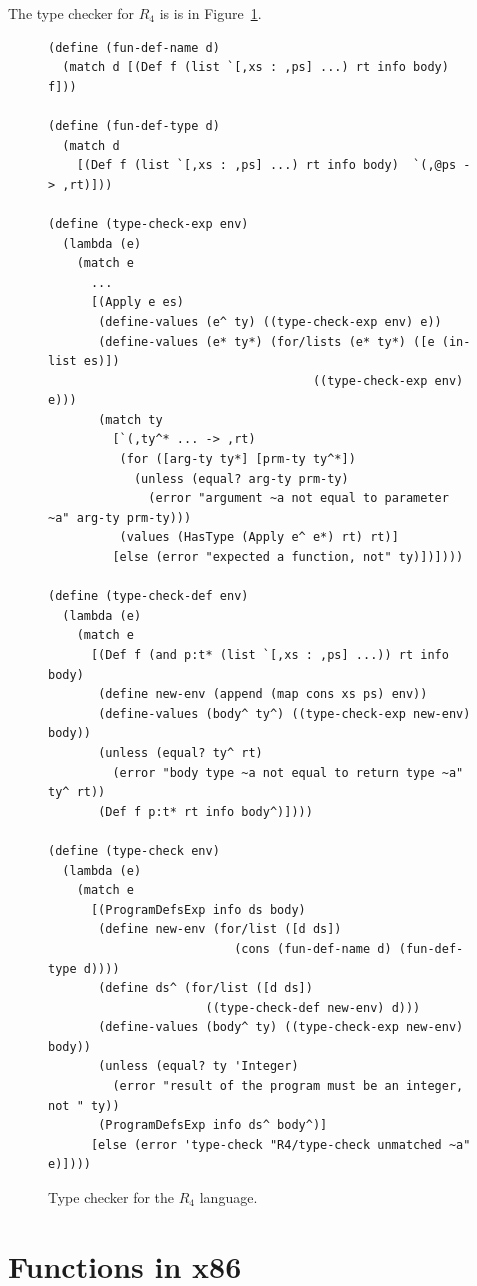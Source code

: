 \documentclass[11pt]{book}
\newcommand{\margincomment}[1]{\marginpar{\color{comment-red}\tiny #1}}
\newcommand{\margincomment}[1]{}
\begin{document}
\margincomment{TODO: explain type checker}

The type checker for $R_4$ is is in Figure~\ref{fig:type-check-R4}.

\begin{figure}[tp]
\begin{lstlisting}[basicstyle=\ttfamily\footnotesize]
(define (fun-def-name d)
  (match d [(Def f (list `[,xs : ,ps] ...) rt info body)  f]))

(define (fun-def-type d)
  (match d
    [(Def f (list `[,xs : ,ps] ...) rt info body)  `(,@ps -> ,rt)]))

(define (type-check-exp env)
  (lambda (e)
    (match e
      ...
      [(Apply e es)
       (define-values (e^ ty) ((type-check-exp env) e))
       (define-values (e* ty*) (for/lists (e* ty*) ([e (in-list es)])
                                     ((type-check-exp env) e)))
       (match ty
         [`(,ty^* ... -> ,rt)
          (for ([arg-ty ty*] [prm-ty ty^*])
            (unless (equal? arg-ty prm-ty)
              (error "argument ~a not equal to parameter ~a" arg-ty prm-ty)))
          (values (HasType (Apply e^ e*) rt) rt)]
         [else (error "expected a function, not" ty)])])))

(define (type-check-def env)
  (lambda (e)
    (match e
      [(Def f (and p:t* (list `[,xs : ,ps] ...)) rt info body)
       (define new-env (append (map cons xs ps) env))
       (define-values (body^ ty^) ((type-check-exp new-env) body))
       (unless (equal? ty^ rt)
         (error "body type ~a not equal to return type ~a" ty^ rt))
       (Def f p:t* rt info body^)])))	 

(define (type-check env)
  (lambda (e)
    (match e
      [(ProgramDefsExp info ds body)
       (define new-env (for/list ([d ds]) 
                          (cons (fun-def-name d) (fun-def-type d))))
       (define ds^ (for/list ([d ds])
                      ((type-check-def new-env) d)))
       (define-values (body^ ty) ((type-check-exp new-env) body))
       (unless (equal? ty 'Integer)
         (error "result of the program must be an integer, not " ty))
       (ProgramDefsExp info ds^ body^)]
      [else (error 'type-check "R4/type-check unmatched ~a" e)])))
\end{lstlisting}
\caption{Type checker for the $R_4$ language.}
\label{fig:type-check-R4}
\end{figure}




\section{Functions in x86}
\label{sec:fun-x86}
\end{document}
